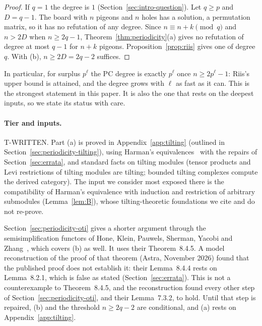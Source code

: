 \begin{proof}
If $q=1$ the degree is $1$ (Section~\ref{sec:intro-question}).  Let $q\ge p$ and $D=q-1$.
The board with $n$ pigeons and $n$ holes has a solution, a permutation matrix, so it has no
refutation of any degree.  Since $n\equiv n+k\pmod q$ and $n>2D$ when $n\ge2q-1$,
Theorem~\ref{thm:periodicity}(a) gives no refutation of degree at most $q-1$ for $n+k$
pigeons.  Proposition~\ref{prop:riis} gives one of degree $q$.  With (b), $n\ge2D=2q-2$
suffices.
\end{proof}

In particular, for surplus $p^\ell$ the PC degree is exactly $p^\ell$ once $n\ge2p^\ell-1$:
Riis's upper bound is attained, and the degree grows with $\ell$ as fast as it can.  This is
the strongest statement in this paper.  It is also the one that rests on the deepest
inputs, so we state its status with care.

\paragraph{Tier and inputs.}  T-WRITTEN.  Part (a) is proved in Appendix~\ref{app:tilting}
(outlined in Section~\ref{sec:periodicity-tilting}), using Harman's
equivalences~\cite{harman2015} with the repairs of Section~\ref{sec:errata}, and standard facts
on tilting modules (tensor products and Levi restrictions of tilting modules are tilting;
bounded tilting complexes compute the derived category).  The input we consider most exposed
there is the compatibility of Harman's equivalence with induction and restriction of
arbitrary submodules (Lemma~\ref{lem:B}), whose tilting-theoretic foundations we cite and do
not re-prove.

Section~\ref{sec:periodicity-oti} gives a shorter argument through the semisimplification
functors of Hone, Klein, Pauwels, Sherman, Yacobi and Zhang~\cite{hone2025}, which covers (b)
as well.  It uses their Theorem~8.4.5.  A model reconstruction of the proof of that theorem
(Astra, November 2026) found that the published proof does not establish it: their
Lemma~8.4.4 rests on Lemma~8.2.1, which is false as stated (Section~\ref{sec:errata}).  This is
not a counterexample to Theorem~8.4.5, and the reconstruction found every other step of
Section~\ref{sec:periodicity-oti}, and their Lemma~7.3.2, to hold.  Until that step is
repaired, (b) and the threshold $n\ge2q-2$ are conditional, and (a) rests on
Appendix~\ref{app:tilting}.

